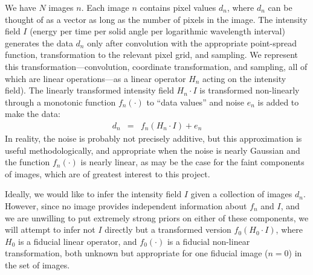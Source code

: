 \documentclass[12pt]{article}
\begin{document}
We have $N$ images $n$.  Each image $n$ contains pixel values $d_n$,
where $d_n$ can be thought of as a vector as long as the number of
pixels in the image.  The intensity field $I$ (energy per time per
solid angle per logarithmic wavelength interval) generates the data
$d_n$ only after convolution with the appropriate point-spread
function, transformation to the relevant pixel grid, and sampling.  We
represent this transformation---convolution, coordinate
transformation, and sampling, all of which are linear operations---as
a linear operator $H_n$ acting on the intensity field).  The linearly
transformed intensity field $H_n\cdot I$ is transformed non-linearly
through a monotonic function $f_n(\cdot)$ to ``data values'' and noise
$e_n$ is added to make the data:
\begin{eqnarray}
d_n &=& f_n(H_n\cdot I) + e_n
\end{eqnarray}
In reality, the noise is probably not precisely additive, but this
approximation is useful methodologically, and appropriate when the
noise is nearly Gaussian and the function $f_n(\cdot)$ is nearly
linear, as may be the case for the faint components of images, which
are of greatest interest to this project.

Ideally, we would like to infer the intensity field $I$ given a
collection of images $d_n$.  However, since no image provides
independent information about $f_n$ and $I$, and we are unwilling to
put extremely strong priors on either of these components, we will
attempt to infer not $I$ directly but a transformed version
$f_0(H_0\cdot I)$, where $H_0$ is a fiducial linear operator, and
$f_0(\cdot)$ is a fiducial non-linear transformation, both unknown but
appropriate for one fiducial image ($n=0$) in the set of images.
\end{document}
